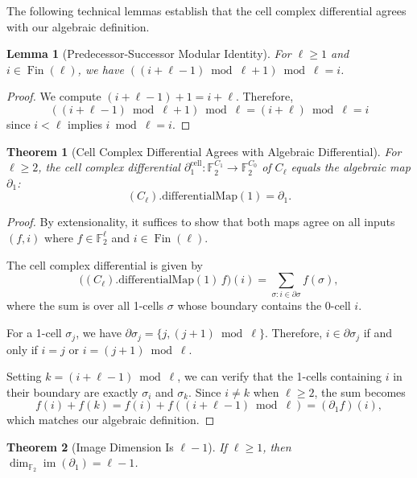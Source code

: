 \documentclass[11pt]{article}
\theoremstyle{plain}
\newtheorem*{theorem}{Theorem}
\newtheorem*{lemma}{Lemma}
\theoremstyle{definition}
\theoremstyle{remark}
\begin{document}
The following technical lemmas establish that the cell complex differential agrees with our algebraic definition.

\begin{lemma}[Predecessor-Successor Modular Identity]
For $\ell \geq 1$ and $i \in \operatorname{Fin}(\ell)$, we have $\left((i + \ell - 1)\bmod\ell + 1\right)\bmod\ell = i$.
\end{lemma}

\begin{proof}
We compute $(i + \ell - 1) + 1 = i + \ell$. Therefore,
\[
\left((i + \ell - 1)\bmod\ell + 1\right)\bmod\ell = (i + \ell)\bmod\ell = i
\]
since $i < \ell$ implies $i\bmod\ell = i$.
\end{proof}

\begin{theorem}[Cell Complex Differential Agrees with Algebraic Differential]
For $\ell \geq 2$, the cell complex differential $\partial_1^{\mathrm{cell}} : \mathbb{F}_2^{C_1} \to \mathbb{F}_2^{C_0}$ of $C_\ell$ equals the algebraic map $\partial_1$:
\[
(C_\ell).\text{differentialMap}(1) = \partial_1.
\]
\end{theorem}

\begin{proof}
By extensionality, it suffices to show that both maps agree on all inputs $(f, i)$ where $f \in \mathbb{F}_2^\ell$ and $i \in \operatorname{Fin}(\ell)$.

The cell complex differential is given by
\[
\bigl((C_\ell).\text{differentialMap}(1)\, f\bigr)(i) = \sum_{\sigma: i \in \partial\sigma} f(\sigma),
\]
where the sum is over all 1-cells $\sigma$ whose boundary contains the 0-cell $i$.

For a 1-cell $\sigma_j$, we have $\partial\sigma_j = \{j, (j+1)\bmod\ell\}$. Therefore, $i \in \partial\sigma_j$ if and only if $i = j$ or $i = (j+1)\bmod\ell$.

Setting $k = (i + \ell - 1)\bmod\ell$, we can verify that the 1-cells containing $i$ in their boundary are exactly $\sigma_i$ and $\sigma_k$. Since $i \neq k$ when $\ell \geq 2$, the sum becomes
\[
f(i) + f(k) = f(i) + f((i + \ell - 1)\bmod\ell) = (\partial_1 f)(i),
\]
which matches our algebraic definition.
\end{proof}

\begin{theorem}[Image Dimension Is $\ell - 1$]
If $\ell \geq 1$, then $\dim_{\mathbb{F}_2}\operatorname{im}(\partial_1) = \ell - 1$.
\end{theorem}
\end{document}
